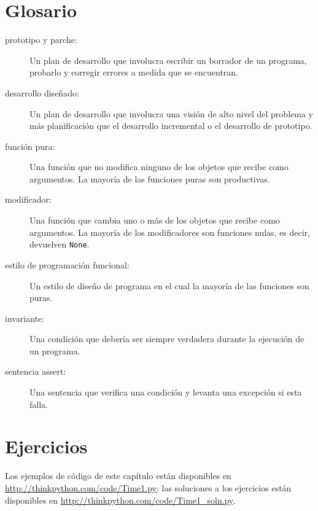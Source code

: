 \documentclass[10pt]{book}
\begin{document}
\section{Glosario}

\begin{description}

\item[prototipo y parche:] Un plan de desarrollo que involucra
escribir un borrador de un programa, probarlo y corregir errores a medida que
se encuentran.

\item[desarrollo diseñado:] Un plan de desarrollo que involucra una
visión de alto nivel del problema y más planificación que el desarrollo
incremental o el desarrollo de prototipo.

\item[función pura:] Una función que no modifica ninguno de los objetos que
recibe como argumentos.  La mayoría de las funciones puras son productivas.

\item[modificador:] Una función que cambia uno o más de los objetos que
  recibe como argumentos.  La mayoría de los modificadores son funciones nulas, es decir,
  devuelven {\tt None}.

\item[estilo de programación funcional:] Un estilo de diseño de programa en el cual la
mayoría de las funciones son puras.

\item[invariante:] Una condición que debería ser siempre verdadera durante la
ejecución de un programa.

\item[sentencia assert:] Una sentencia que verifica una condición y levanta
una excepción si esta falla.

\end{description}


\section{Ejercicios}

Los ejemplos de código de este capítulo están disponibles en
\url{http://thinkpython.com/code/Time1.py}; las soluciones a los
ejercicios están disponibles en \url{http://thinkpython.com/code/Time1_soln.py}.
\end{document}
